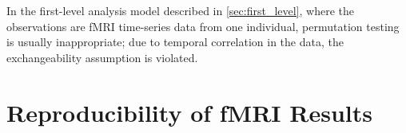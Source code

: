 In the first-level analysis model described in \ref{sec:first_level}, where the observations are fMRI time-series data from one individual, permutation testing is usually inappropriate; due to temporal correlation in the data, the exchangeability assumption is violated. 

\section{Reproducibility of fMRI Results}

